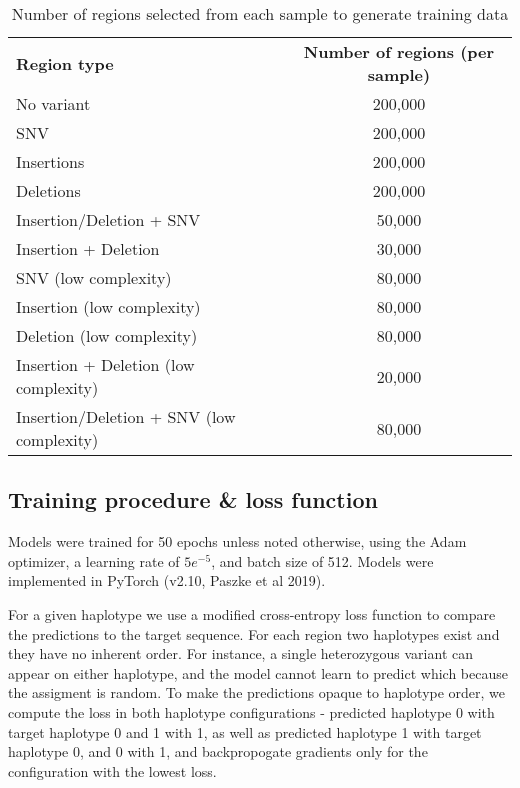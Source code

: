 \documentclass[]{article}
\begin{document}
\begin{center}
	\begin{table}
	\begin{tabular}{ lc }
	 \textbf{Region type} & \textbf{Number of regions (per sample)} \\
	 No variant & 200,000 \\
	 SNV & 200,000 \\
	 Insertions & 200,000 \\
	 Deletions & 200,000 \\
	 Insertion/Deletion + SNV & 50,000 \\
	 Insertion + Deletion & 30,000 \\
	 SNV (low complexity) & 80,000 \\
	 Insertion (low complexity) & 80,000 \\
	 Deletion (low complexity) & 80,000 \\  
	 Insertion + Deletion (low complexity) & 20,000 \\
	 Insertion/Deletion + SNV (low complexity) & 80,000 \\
	\end{tabular}
	\caption{Number of regions selected from each sample to generate training data}
	\label{table:regioncounts}
\end{table}
\end{center}

\subsection{Training procedure \& loss function}

Models were trained for 50 epochs unless noted otherwise, using the Adam optimizer, a learning rate of $5e^{-5}$, and batch size of 512. Models were implemented in PyTorch (v2.10, Paszke et al 2019).

For a given haplotype we use a modified cross-entropy loss function to compare the predictions to the target sequence. For each region two haplotypes exist and they have no inherent order. For instance, a single heterozygous variant can appear on either haplotype, and the model cannot learn to predict which because the assigment is random. To make the predictions opaque to haplotype order, we compute the loss in both haplotype configurations - predicted haplotype 0 with target haplotype 0 and 1 with 1, as well as predicted haplotype 1 with target haplotype 0, and 0 with 1, and backpropogate gradients only for the configuration with the lowest loss. 
\end{document}
